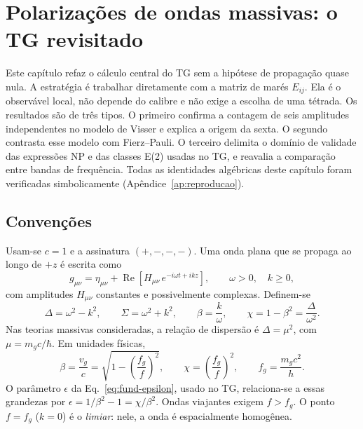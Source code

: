 \chapter{Polarizações de ondas massivas: o TG revisitado}
\label{cap:polarizacoes}

Este capítulo refaz o cálculo central do TG sem a hipótese de
propagação quase nula. A estratégia é trabalhar diretamente com a matriz
de marés $E_{ij}$. Ela é o observável local, não depende do calibre e
não exige a escolha de uma tétrada. Os resultados são de três tipos. O
primeiro confirma a contagem de seis amplitudes independentes no modelo
de Visser e explica a origem da sexta. O segundo contrasta esse modelo
com Fierz--Pauli. O terceiro delimita o domínio de validade das
expressões NP e das classes E(2) usadas no TG, e reavalia a comparação
entre bandas de frequência. Todas as identidades algébricas deste
capítulo foram verificadas simbolicamente
(Apêndice~\ref{ap:reproducao}).

\section{Convenções}

Usam-se $c=1$ e a assinatura $(+,-,-,-)$. Uma onda plana que se propaga
ao longo de $+z$ é escrita como
\begin{equation}
 g_{\mu\nu}=\eta_{\mu\nu}+\operatorname{Re}\left[H_{\mu\nu}\,
 e^{-i\omega t+ikz}\right],
 \qquad \omega>0,\quad k\geq0,
 \label{eq:pol-onda}
\end{equation}
com amplitudes $H_{\mu\nu}$ constantes e possivelmente complexas.
Definem-se
\begin{equation}
 \Delta=\omega^2-k^2,\qquad \Sigma=\omega^2+k^2,\qquad
 \beta=\frac{k}{\omega},\qquad
 \chi=1-\beta^2=\frac{\Delta}{\omega^2}.
 \label{eq:pol-defs}
\end{equation}
Nas teorias massivas consideradas, a relação de dispersão é
$\Delta=\mu^2$, com $\mu=m_gc/\hbar$. Em unidades físicas,
\begin{equation}
 \beta=\frac{v_g}{c}=\sqrt{1-\left(\frac{f_g}{f}\right)^2},
 \qquad \chi=\left(\frac{f_g}{f}\right)^2,
 \qquad f_g=\frac{m_gc^2}{h}.
 \label{eq:pol-dispersao}
\end{equation}
O parâmetro $\epsilon$ da Eq.~\eqref{eq:fund-epsilon}, usado no TG,
relaciona-se a essas grandezas por $\epsilon=1/\beta^2-1=\chi/\beta^2$.
Ondas viajantes exigem $f>f_g$. O ponto $f=f_g$ ($k=0$) é o
\emph{limiar}: nele, a onda é espacialmente homogênea.

